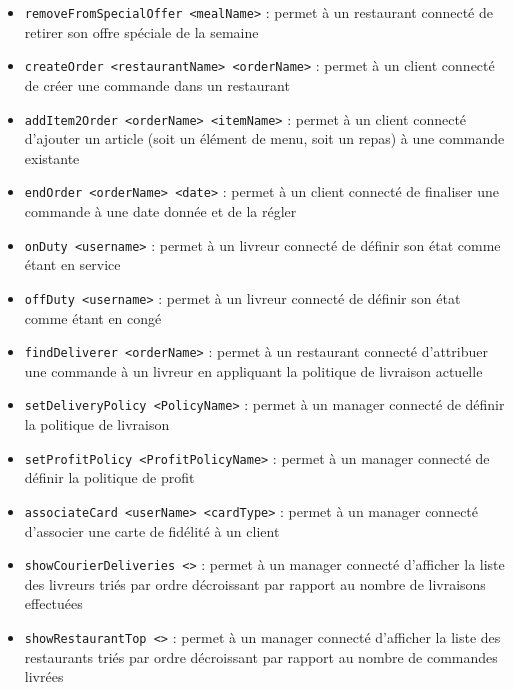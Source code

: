 \begin{itemize}
    \item \texttt{removeFromSpecialOffer <mealName>} : permet à un restaurant connecté de retirer son offre spéciale de la semaine\\
    \item \texttt{createOrder <restaurantName> <orderName>} : permet à un client connecté de créer une commande dans un restaurant\\
    \item \texttt{addItem2Order <orderName> <itemName>} : permet à un client connecté d'ajouter un article (soit un élément de menu, soit un repas) à une commande existante\\
    \item \texttt{endOrder <orderName> <date>} : permet à un client connecté de finaliser une commande à une date donnée et de la régler\\
    \item \texttt{onDuty <username>} : permet à un livreur connecté de définir son état comme étant en service\\
    \item \texttt{offDuty <username>} : permet à un livreur connecté de définir son état comme étant en congé\\
    \item \texttt{findDeliverer <orderName>} : permet à un restaurant connecté d'attribuer une commande à un livreur en appliquant la politique de livraison actuelle\\
    \item \texttt{setDeliveryPolicy <PolicyName>} : permet à un manager connecté de définir la politique de livraison\\
    \item \texttt{setProfitPolicy <ProfitPolicyName>} : permet à un manager connecté de définir la politique de profit\\
    \item \texttt{associateCard <userName> <cardType>} : permet à un manager connecté d'associer une carte de fidélité à un client\\
    \item \texttt{showCourierDeliveries <>} : permet à un manager connecté d'afficher la liste des livreurs triés par ordre décroissant par rapport au nombre de livraisons effectuées\\
    \item \texttt{showRestaurantTop <>} : permet à un manager connecté d'afficher la liste des restaurants triés par ordre décroissant par rapport au nombre de commandes livrées\\

\end{itemize}
